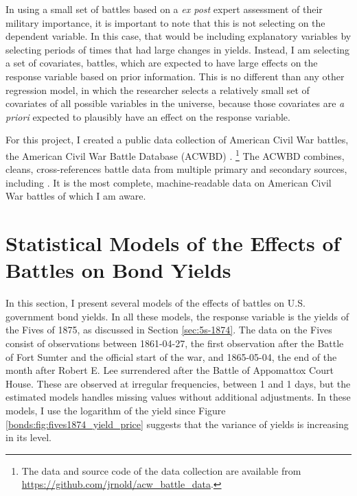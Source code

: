 In using a small set of battles based on a \textit{ex post} expert assessment of their military importance, it is important to note that this is not selecting on the dependent variable.
In this case, that would be including explanatory variables by selecting periods of times that had large changes in yields.
Instead, I am selecting a set of covariates, \ie{}battles, which are expected to have large effects on the response variable based on prior information.
This is no different than any other regression model, in which the researcher selects a relatively small set of covariates of all possible variables in the universe, because those covariates are \textit{a priori} expected to plausibly have an effect on the response variable.

For this project, I created a public data collection of American Civil War battles, the American Civil War Battle Database (ACWBD) \parencite{Arnold2015b}.%
\footnote{The data and source code of the data collection are available from \url{https://github.com/jrnold/acw_battle_data}.}
The ACWBD combines, cleans, cross-references battle data from multiple primary and secondary sources, including \textcites{Phisterer1883}{Livermore1900}{Bodart1908}{dyer1908_war_rebel}{KennedyConservation1998}{CWSAC1993}{cwsac2012}.
It is the most complete, machine-readable data on American Civil War battles of which I am aware.



\section{Statistical Models of the Effects of Battles on Bond Yields}
\label{sec:model-war-events}

In this section, I present several models of the effects of battles on U.S. government bond yields.
In all these models, the response variable is the yields of the Fives of 1875, as discussed in Section \ref{sec:5s-1874}.
The data on the Fives consist of  observations between 1861-04-27, the first observation after the Battle of Fort Sumter and the official start of the war, and 1865-05-04, the end of the month after Robert E. Lee surrendered after the Battle of Appomattox Court House.
These are observed at irregular frequencies, between 1 and 1 days, but the estimated models handles missing values without additional adjustments.
In these models, I use the logarithm of the yield since Figure \ref{bonds:fig:fives1874_yield_price} suggests that the variance of yields is increasing in its level.

